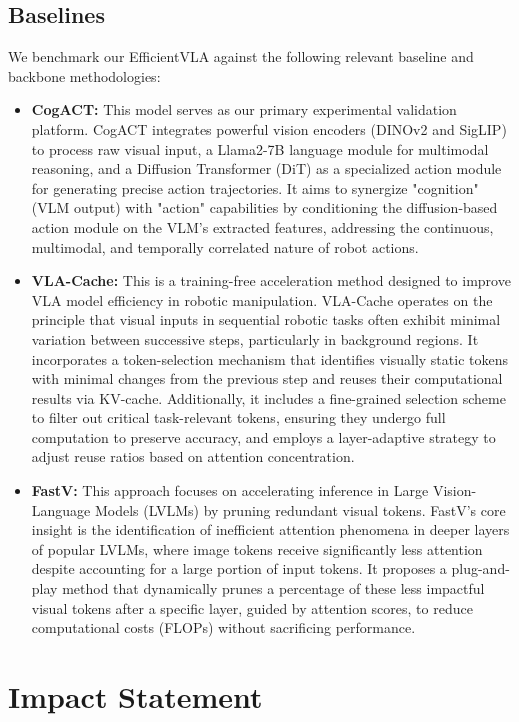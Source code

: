 \subsection{Baselines}
We benchmark our EfficientVLA against the following relevant baseline and backbone methodologies:
\begin{itemize}
    \item \textbf{CogACT:} This model serves as our primary experimental validation platform. CogACT integrates powerful vision encoders (DINOv2 and SigLIP) to process raw visual input, a Llama2-7B language module for multimodal reasoning, and a Diffusion Transformer (DiT) as a specialized action module for generating precise action trajectories. It aims to synergize "cognition" (VLM output) with "action" capabilities by conditioning the diffusion-based action module on the VLM's extracted features, addressing the continuous, multimodal, and temporally correlated nature of robot actions.

    \item \textbf{VLA-Cache:} This is a training-free acceleration method designed to improve VLA model efficiency in robotic manipulation. VLA-Cache operates on the principle that visual inputs in sequential robotic tasks often exhibit minimal variation between successive steps, particularly in background regions. It incorporates a token-selection mechanism that identifies visually static tokens with minimal changes from the previous step and reuses their computational results via KV-cache. Additionally, it includes a fine-grained selection scheme to filter out critical task-relevant tokens, ensuring they undergo full computation to preserve accuracy, and employs a layer-adaptive strategy to adjust reuse ratios based on attention concentration.

    \item \textbf{FastV:} This approach focuses on accelerating inference in Large Vision-Language Models (LVLMs) by pruning redundant visual tokens. FastV's core insight is the identification of inefficient attention phenomena in deeper layers of popular LVLMs, where image tokens receive significantly less attention despite accounting for a large portion of input tokens. It proposes a plug-and-play method that dynamically prunes a percentage of these less impactful visual tokens after a specific layer, guided by attention scores, to reduce computational costs (FLOPs) without sacrificing performance.
\end{itemize}

\section{Impact Statement}

